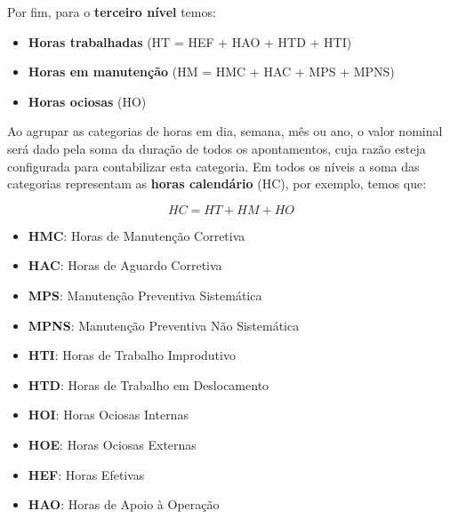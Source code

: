 \documentclass[
  letterpaper,
]{book}
\providecommand{\tightlist}{%
  \setlength{\itemsep}{0pt}\setlength{\parskip}{0pt}}\usepackage{longtable,booktabs,array}
\begin{document}
Por fim, para o \textbf{terceiro nível} temos:

\begin{itemize}
\tightlist
\item
  \textbf{Horas trabalhadas} (HT = HEF + HAO + HTD + HTI)
\item
  \textbf{Horas em manutenção} (HM = HMC + HAC + MPS + MPNS)
\item
  \textbf{Horas ociosas} (HO)
\end{itemize}

Ao agrupar as categorias de horas em dia, semana, mês ou ano, o valor
nominal será dado pela soma da duração de todos os apontamentos, cuja
razão esteja configurada para contabilizar esta categoria. Em todos os
níveis a soma das categorias representam as \textbf{horas calendário}
(HC), por exemplo, temos que:

\[
HC = HT + HM + HO
\]

\begin{tcolorbox}[enhanced jigsaw, titlerule=0mm, coltitle=black, rightrule=.15mm, colback=white, breakable, title=\textcolor{quarto-callout-note-color}{\faInfo}\hspace{0.5em}{Legenda das Categorias de Horas}, opacityback=0, bottomtitle=1mm, opacitybacktitle=0.6, arc=.35mm, colbacktitle=quarto-callout-note-color!10!white, toptitle=1mm, bottomrule=.15mm, left=2mm, toprule=.15mm, leftrule=.75mm, colframe=quarto-callout-note-color-frame]

\begin{itemize}
\tightlist
\item
  \textbf{HMC}: Horas de Manutenção Corretiva
\item
  \textbf{HAC}: Horas de Aguardo Corretiva
\item
  \textbf{MPS}: Manutenção Preventiva Sistemática
\item
  \textbf{MPNS}: Manutenção Preventiva Não Sistemática
\item
  \textbf{HTI}: Horas de Trabalho Improdutivo
\item
  \textbf{HTD}: Horas de Trabalho em Deslocamento
\item
  \textbf{HOI}: Horas Ociosas Internas
\item
  \textbf{HOE}: Horas Ociosas Externas
\item
  \textbf{HEF}: Horas Efetivas
\item
  \textbf{HAO}: Horas de Apoio à Operação
\end{itemize}

\end{tcolorbox}
\end{document}
